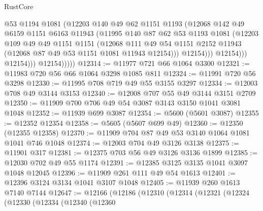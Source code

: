 \begin{lexlean}{RustCore}
\begin{coremodule}
                          @53
                          @1194
                          @1081
                          (@12203
                            @140
                            @49
                            @62
                            @1151
                            @1193
                            (@12068
                              @142
                              @49
                              @6159
                              @1151
                              @6163
                              @11943
                              (@11995
                                @140
                                @87
                                @62
                                @53
                                @1193
                                @1081
                                (@12203
                                  @109
                                  @49
                                  @49
                                  @1151
                                  @1151
                                  (@12068
                                    @111
                                    @49
                                    @54
                                    @1151
                                    @2152
                                    @11943
                                    (@12068 @87 @49 @53 @1151 @1081 @11943 @12154)))
                                @12154)))
                          @12154)))
                    @12154)))
              @12154)))))
@12314 := @11977 @721 @66 @1064 @3300
@12321 := @11983 @720 @56 @66 @1064 @3298 @1085 @811
@12324 := @11991 @720 @56 @3298
@12330 := @11995 @708 @719 @49 @55 @3155 @3297
@12334 := @12003 @708 @49 @3144 @3153
@12340 := @12008 @707 @55 @49 @3144 @3151 @2709
@12350 := @11909 @700 @706 @49 @54 @3087 @3143 @3150 @1041 @3081 @1048
@12352 := @11939 @699 @3087
@12354 := @5600 (@5601 @3087)
@12355 := @12352 @12354
@12358 := @5605 (@5607 @699 @49)
@12360 := @12350 (@12355 @12358)
@12370 := @11909 @704 @87 @49 @53 @3140 @1064 @1081 @1041 @746 @1048
@12374 := @12003 @704 @49 @3126 @3138
@12375 := @11901 @317
@12381 := @12375 @703 @56 @49 @3126 @3136 @1899
@12385 := @12030 @702 @49 @55 @1174
@12391 := @12385 @3125 @3135 @1041 @3097 @1048 @12045
@12396 := @11909 @261 @111 @49 @54 @1613
@12401 := @12396 @3124 @3134 @1041 @3107 @1048
@12405 := @11939 @260 @1613 @7140 @7144
@12647 := @12166
    (@12186
      (@12310
        (@12314
          (@12321
            (@12324
              (@12330
                (@12334
                  (@12340
                    (@12360

\end{coremodule}
\end{lexlean}
